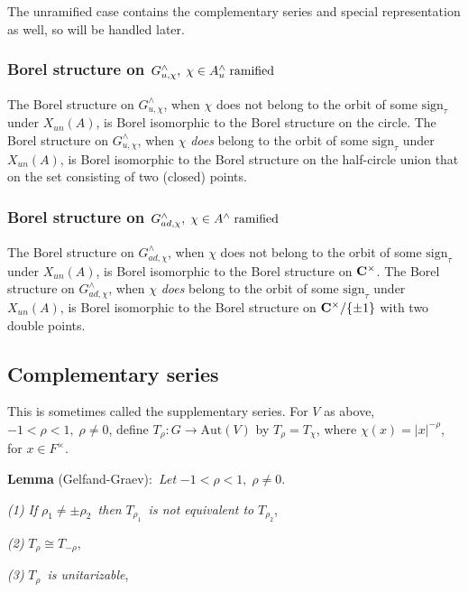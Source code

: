 \documentclass[11pt, a4paper]{article}
\begin{document}
The unramified case contains the complementary series and special
representation as well, so will be handled later.

\subsubsection{Borel structure on $G_{u,\chi }^{\wedge },\;\chi \in
A_u^{\wedge }\;{\rm ramified}$}

The Borel structure on $G_{u,\chi }^{\wedge }$, when $\chi $ does not belong
to the orbit of some $\mathrm{sign}_\tau $ under $X_{un}(A)$, is Borel isomorphic to
the Borel structure on the circle. The Borel structure on $G_{u,\chi
}^{\wedge }$, when $\chi $ {\em does} belong to the orbit of some $\mathrm{sign}_\tau 
$ under $X_{un}(A)$, is Borel isomorphic to the Borel structure on the
half-circle union that on the set consisting of two (closed) points.

\subsubsection{Borel structure on $G_{ad,\chi }^{\wedge },\;\chi \in
A^{\wedge }\;{\rm ramified}$}

The Borel structure on $G_{ad,\chi }^{\wedge }$, when $\chi $ does not
belong to the orbit of some $\mathrm{sign}_\tau $ under $X_{un}(A)$, is Borel
isomorphic to the Borel structure on ${\bf C}^{\times }$.
The Borel structure on $G_{ad,\chi }^{\wedge }$, when $\chi $ {\em does}
belong to the orbit of some $\mathrm{sign}_\tau $ under $X_{un}(A)$, is Borel
isomorphic to the Borel structure on ${\bf C}^{\times }/\{\pm 1\}$ with two
double points.

\subsection{Complementary series}

This is sometimes called the supplementary series. For $V$ as above, $%
-1<\rho <1,\;\rho \neq 0$, define $T_\rho :G\rightarrow \mathrm{Aut}(V)$ by $T_\rho
=T_\chi $, where $\chi (x)=|x|^{-\rho }$, for $x\in F^{\times }$.

{\bf Lemma} (Gelfand-Graev):{\em \ Let }$-1<\rho <1,\;\rho \neq 0$.

{\em (1) If }$\rho _1\neq \pm \rho _2${\em \ then }$T_{\rho _1}${\em \ is
not equivalent to }$T_{\rho _2}$,

{\em (2) }$T_\rho \cong T_{-\rho }$,

{\em (3) }$T_\rho ${\em \ is unitarizable},
\end{document}
